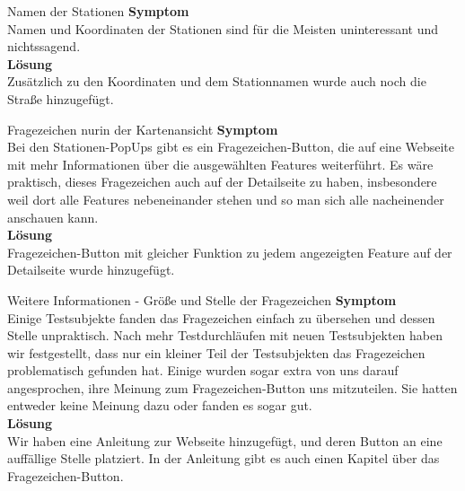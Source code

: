     \begin{Bug}{Namen der Stationen}
      \textbf{Symptom}\\
      Namen und Koordinaten der Stationen sind für die Meisten uninteressant und nichtssagend.\\
      \linebreak
      \textbf{Lösung}\\
      Zusätzlich zu den Koordinaten und dem Stationnamen wurde auch noch die Straße hinzugefügt.\\
    \end{Bug}

    \begin{Bug}{Fragezeichen nurin der Kartenansicht}
      \textbf{Symptom}\\
      Bei den Stationen-PopUps gibt es ein Fragezeichen-Button, die auf eine Webseite mit mehr Informationen über die ausgewählten Features weiterführt. Es wäre praktisch, dieses Fragezeichen auch auf der Detailseite zu haben, insbesondere weil dort alle Features nebeneinander stehen und so man sich alle nacheinender anschauen kann.\\
      \linebreak
      \textbf{Lösung}\\
      Fragezeichen-Button mit gleicher Funktion zu jedem angezeigten Feature auf der Detailseite wurde hinzugefügt.\\
    \end{Bug}
    
    \begin{Bug}{Weitere Informationen - Größe und Stelle der Fragezeichen}
      \textbf{Symptom}\\
      Einige Testsubjekte fanden das Fragezeichen einfach zu übersehen und dessen Stelle unpraktisch. Nach mehr Testdurchläufen mit neuen Testsubjekten haben wir festgestellt, dass nur ein kleiner Teil der Testsubjekten das Fragezeichen problematisch gefunden hat. Einige wurden sogar extra von uns darauf angesprochen, ihre Meinung zum Fragezeichen-Button uns mitzuteilen. Sie hatten entweder keine Meinung dazu oder fanden es sogar gut.\\
      \linebreak
      \textbf{Lösung}\\
      Wir haben eine Anleitung zur Webseite hinzugefügt, und deren Button an eine auffällige Stelle platziert. In der Anleitung gibt es auch einen Kapitel über das Fragezeichen-Button. \\
    \end{Bug}

